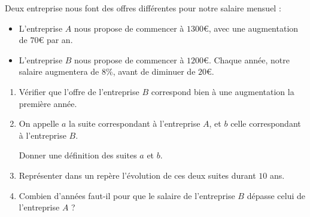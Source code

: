 \documentclass[
	classe=$1^{ere}STI2D$
]{évaluation}
\begin{document}
\begin{exercice}[5]
	Deux entreprise nous font des offres différentes pour notre salaire mensuel :
	\begin{itemize}
		\item L'entreprise $A$ nous propose de commencer à $1300$€, avec une augmentation de $70$€ par an.
		\item L'entreprise $B$ nous propose de commencer à $1200$€. Chaque année, notre salaire augmentera de $8$\%, avant de diminuer de $20$€.
	\end{itemize}
	\begin{enumerate}
		\item Vérifier que l'offre de l'entreprise $B$ correspond bien à une augmentation la première année.
		\item On appelle $a$ la suite correspondant à l'entreprise $A$, et $b$ celle correspondant à l'entreprise $B$.

		      Donner une définition des suites $a$ et $b$.
		\item Représenter dans un repère l'évolution de ces deux suites durant $10$ ans.

		\item Combien d'années faut-il pour que le salaire de l'entreprise $B$ dépasse celui de l'entreprise $A$ ?
	\end{enumerate}
\end{exercice}
\end{document}
